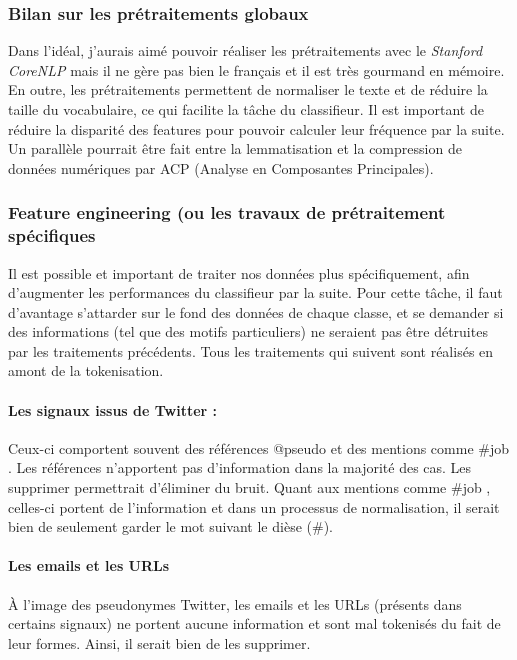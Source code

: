             \subsubsection{Bilan sur les prétraitements globaux}
                Dans l'idéal, j'aurais aimé pouvoir réaliser les prétraitements avec le \textit{Stanford CoreNLP} mais il ne gère pas bien le français et il est très gourmand en mémoire.\\
                En outre, les prétraitements permettent de normaliser le texte et de réduire la taille du vocabulaire, ce qui facilite la tâche du classifieur. Il est important de réduire la disparité des features pour pouvoir calculer leur fréquence par la suite.\\
                Un parallèle pourrait être fait entre la lemmatisation et la compression de données numériques par ACP (Analyse en Composantes Principales).

            \subsubsection{Feature engineering (ou les travaux de prétraitement spécifiques}
                Il est possible et important de traiter nos données plus spécifiquement, afin d'augmenter les performances du classifieur par la suite. Pour cette tâche, il faut d'avantage s'attarder sur le fond des données de chaque classe, et se demander si des informations (tel que des motifs particuliers) ne seraient pas être détruites par les traitements précédents. Tous les traitements qui suivent sont réalisés en amont de la tokenisation.

                \paragraph{Les signaux issus de Twitter :}
                    Ceux-ci comportent souvent des références \og @pseudo \fg et des mentions comme \og \#job \fg. Les références n'apportent pas d'information dans la majorité des cas. Les supprimer permettrait d’éliminer du bruit. Quant aux mentions comme \og \#job \fg, celles-ci portent de l'information et dans un processus de normalisation, il serait bien de seulement garder le mot suivant le dièse (\#).

                \paragraph{Les emails et les URLs}
                    À l'image des pseudonymes Twitter, les emails et les URLs (présents dans certains signaux) ne portent aucune information et sont mal tokenisés du fait de leur formes. Ainsi, il serait bien de les supprimer.

